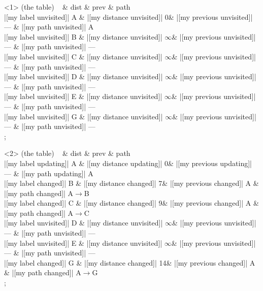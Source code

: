 \begin{onlyenv}<1>
 (the table) {
~ \& dist \& prev \& path \\
|[my label unvisited]| A \& |[my distance unvisited]| 0\& |[my previous unvisited]| --- \& |[my path unvisited]| A\\
|[my label unvisited]| B \& |[my distance unvisited]| $\infty$\& |[my previous unvisited]| --- \& |[my path unvisited]| ---\\
|[my label unvisited]| C \& |[my distance unvisited]| $\infty$\& |[my previous unvisited]| --- \& |[my path unvisited]| ---\\
|[my label unvisited]| D \& |[my distance unvisited]| $\infty$\& |[my previous unvisited]| --- \& |[my path unvisited]| ---\\
|[my label unvisited]| E \& |[my distance unvisited]| $\infty$\& |[my previous unvisited]| --- \& |[my path unvisited]| ---\\
|[my label unvisited]| G \& |[my distance unvisited]| $\infty$\& |[my previous unvisited]| --- \& |[my path unvisited]| ---\\
};
\end{onlyenv}
            
\begin{onlyenv}<2>
 (the table) {
~ \& dist \& prev \& path \\
|[my label updating]| A \& |[my distance updating]| 0\& |[my previous updating]| --- \& |[my path updating]| A\\
|[my label changed]| B \& |[my distance changed]| 7\& |[my previous changed]| A \& |[my path changed]| A$\rightarrow$B\\
|[my label changed]| C \& |[my distance changed]| 9\& |[my previous changed]| A \& |[my path changed]| A$\rightarrow$C\\
|[my label unvisited]| D \& |[my distance unvisited]| $\infty$\& |[my previous unvisited]| --- \& |[my path unvisited]| ---\\
|[my label unvisited]| E \& |[my distance unvisited]| $\infty$\& |[my previous unvisited]| --- \& |[my path unvisited]| ---\\
|[my label changed]| G \& |[my distance changed]| 14\& |[my previous changed]| A \& |[my path changed]| A$\rightarrow$G\\
};
\end{onlyenv}
            
